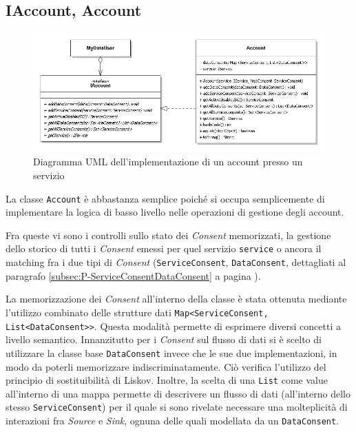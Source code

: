 \subsection{IAccount, Account}
\label{subsec:P-Account}
\begin{figure} [h]
	\centering
	\includegraphics[width=0.95\linewidth]{pictures/Accounting-Account.png}
	\caption{Diagramma UML dell'implementazione di un account presso un servizio}
	\label{fig:Accounting-Account}
\end{figure}
La classe \texttt{Account} \`e abbastanza semplice poich\'e si occupa semplicemente di implementare la logica di basso livello nelle operazioni di gestione degli account.

Fra queste vi sono i controlli sullo stato dei \textit{Consent} memorizzati, la gestione dello storico di tutti i \textit{Consent} emessi per quel servizio \texttt{service} o ancora il matching fra i due tipi di \textit{Consent} (\texttt{ServiceConsent}, \texttt{DataConsent}, dettagliati al paragrafo \ref{subsec:P-ServiceConsentDataConsent} a pagina \pageref{subsec:P-ServiceConsentDataConsent}).

La memorizzazione dei \textit{Consent} all’interno della classe \`e stata ottenuta mediante l’utilizzo combinato delle strutture dati \texttt{Map<ServiceConsent, \-List\-<Data\-Consent>{}>}. Questa modalit\`a permette di esprimere diversi concetti a livello semantico. Innanzitutto per i \textit{Consent} sul flusso di dati si \`e scelto di utilizzare la classe base \texttt{DataConsent} invece che le sue due implementazioni, in modo da poterli memorizzare indiscriminatamente. Ci\`o verifica l’utilizzo del principio di sostituibilit\`a di Liskov. Inoltre, la scelta di una \texttt{List} come value all’interno di una mappa permette di descrivere un flusso di dati (all’interno dello stesso \texttt{ServiceConsent}) per il quale si sono rivelate necessare una molteplicit\`a di interazioni fra \textit{Source} e \textit{Sink}, ognuna delle quali modellata da un \texttt{DataConsent}.

